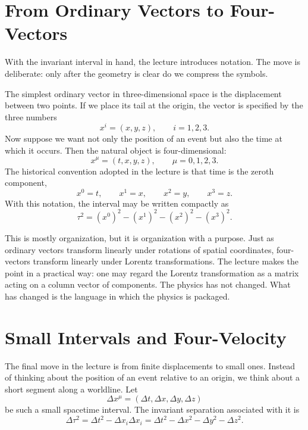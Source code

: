 \section{From Ordinary Vectors to Four-Vectors}

With the invariant interval in hand, the lecture introduces notation. The move is deliberate: only after the geometry is clear do we compress the symbols.

The simplest ordinary vector in three-dimensional space is the displacement between two points. If we place its tail at the origin, the vector is specified by the three numbers
\begin{equation}
x^i=(x,y,z),
\qquad i=1,2,3.
\end{equation}
Now suppose we want not only the position of an event but also the time at which it occurs. Then the natural object is four-dimensional:
\begin{equation}
x^\mu=(t,x,y,z),
\qquad \mu=0,1,2,3.
\end{equation}
The historical convention adopted in the lecture is that time is the zeroth component,
\begin{equation}
x^0=t,
\qquad
x^1=x,
\qquad
x^2=y,
\qquad
x^3=z.
\end{equation}
With this notation, the interval may be written compactly as
\begin{equation}
\tau^2=(x^0)^2-(x^1)^2-(x^2)^2-(x^3)^2.
\end{equation}

This is mostly organization, but it is organization with a purpose. Just as ordinary vectors transform linearly under rotations of spatial coordinates, four-vectors transform linearly under Lorentz transformations. The lecture makes the point in a practical way: one may regard the Lorentz transformation as a matrix acting on a column vector of components. The physics has not changed. What has changed is the language in which the physics is packaged.

\section{Small Intervals and Four-Velocity}

The final move in the lecture is from finite displacements to small ones. Instead of thinking about the position of an event relative to an origin, we think about a short segment along a worldline. Let
\begin{equation}
\Delta x^\mu=(\Delta t,\Delta x,\Delta y,\Delta z)
\end{equation}
be such a small spacetime interval. The invariant separation associated with it is
\begin{equation}
\Delta\tau^2=\Delta t^2-\Delta x_i\Delta x_i
=\Delta t^2-\Delta x^2-\Delta y^2-\Delta z^2.
\end{equation}

